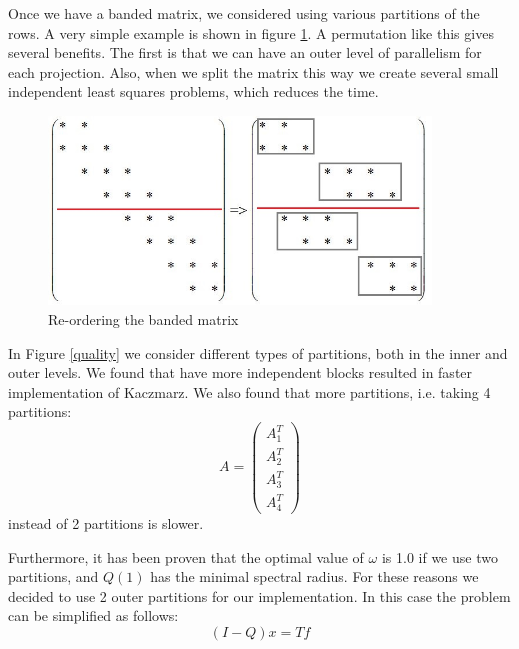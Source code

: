 \documentclass[a4paper,12pt]{article}
\begin{document}
 Once we have a banded matrix, we considered using various partitions of the rows. A very simple example is shown in figure \ref{fig:permutation}. A permutation like this gives several benefits. The first is that we can have an outer level of parallelism for each projection. Also, when we split the matrix this way we create several small independent least squares problems, which reduces the time. 
 
 \begin{figure}[htbp]
\begin{minipage}[b]{1\linewidth}
\centering
\includegraphics[width=4in]{Images/permutation}
\end{minipage}
\caption{Re-ordering the banded matrix}
\label{fig:permutation}
\end{figure}
 
 In Figure \ref{quality} we consider different types of partitions, both in the inner and outer levels. We found that have more independent blocks resulted in faster implementation of Kaczmarz. We also found that more partitions, i.e. taking 4 partitions: $$A = \begin{pmatrix} A_1^T  \\A_2 ^T \\ A_3^T \\ A_4^T \end{pmatrix} $$ instead of 2 partitions is slower. 
 
  Furthermore, it has been proven that the optimal value of $\omega$ is 1.0 if we use two partitions, and $Q(1)$ has the minimal spectral radius. For these reasons we decided to use 2 outer partitions for our implementation. In this case the problem can be simplified as follows: $$(I-Q)x = Tf$$
\end{document}
